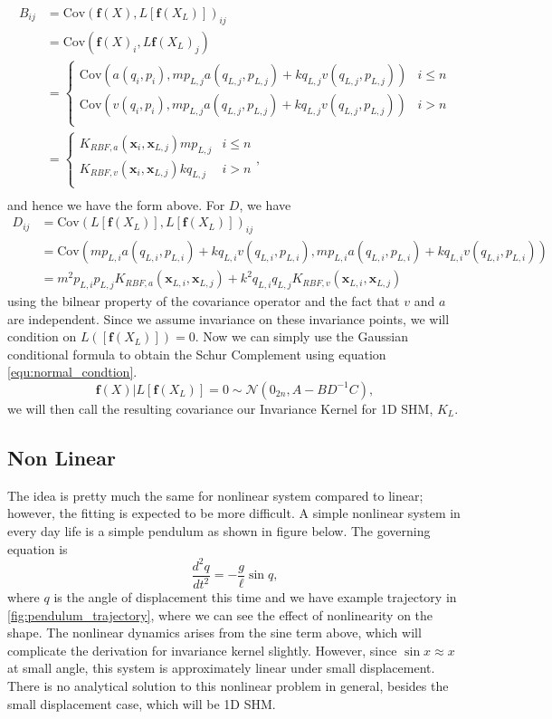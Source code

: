 \documentclass{statsmsc}
\begin{document}
\begin{align*}
B_{ij} &= \mathrm{Cov}(\mathbf{f}(X), L[\mathbf{f}(X_L)])_{ij} \\
       &= \mathrm{Cov}(\mathbf{f}(X)_i, L\mathbf{f}(X_L)_j) \\ 
       &= \begin{cases}
        \mathrm{Cov}(a(q_i, p_i), mp_{L,j}a(q_{L,j},p_{L,j}) + kq_{L,j}v(q_{L,j},p_{L,j})) & i\le n \\ 
        \mathrm{Cov}(v(q_i, p_i), mp_{L,j}a(q_{L,j},p_{L,j}) + kq_{L,j}v(q_{L,j},p_{L,j})) & i>n \\ 
       \end{cases} \\
       &= \begin{cases}
        K_{RBF,a}(\mathbf{x}_i, \mathbf{x}_{L,j}) mp_{L,j} & i\le n \\ 
        K_{RBF,v}(\mathbf{x}_i, \mathbf{x}_{L,j}) kq_{L,j} & i>n \\ 
       \end{cases}, \\
\end{align*}
and hence we have the form above. 
For $D$, we have
\begin{align*}
D_{ij} &= \mathrm{Cov}(L[\mathbf{f}(X_L)], L[\mathbf{f}(X_L)])_{ij} \\
       &= \mathrm{Cov}(mp_{L,i}a(q_{L,i},p_{L,i}) + kq_{L,i}v(q_{L,i},p_{L,i}), mp_{L,i}a(q_{L,i},p_{L,i}) + kq_{L,i}v(q_{L,i},p_{L,i})) \\
       &= m^2p_{L,i}p_{L,j}K_{RBF,a}(\mathbf{x}_{L,i},\mathbf{x}_{L,j}) + k^2q_{L,i}q_{L,j}K_{RBF,v}(\mathbf{x}_{L,i},\mathbf{x}_{L,j})
\end{align*}
using the bilnear property of the covariance operator and the fact that $v$ and $a$ are independent.
Since we assume invariance on these invariance points, we will condition on $L([\mathbf{f}(X_L)])=0.$
Now we can simply use the Gaussian conditional formula to obtain the Schur Complement using equation \ref{equ:normal_condtion}.
$$
\mathbf{f}(X)|L[\mathbf{f}(X_L)]=0\sim\mathcal{N}(0_{2n},A-BD^{-1}C),
$$
we will then call the resulting covariance our Invariance Kernel for 1D SHM, $K_L$.

\subsection{Non Linear}
The idea is pretty much the same for nonlinear system compared to linear; however, the fitting is expected to be more difficult.
A simple nonlinear system in every day life is a simple pendulum as shown in figure below.
The governing equation is 
$$
\frac{d^2q}{dt^2}=-\frac{g}{\ell}\sin q, 
$$
where $q$ is the angle of displacement this time and we have example trajectory in \ref{fig:pendulum_trajectory}, where we can see the effect of nonlinearity on the shape. 
The nonlinear dynamics arises from the sine term above, which will complicate the derivation for invariance kernel slightly. 
However, since $\sin x \approx x$ at small angle, this system is approximately linear under small displacement. 
There is no analytical solution to this nonlinear problem in general, besides the small displacement case, which will be 1D SHM.
\end{document}
